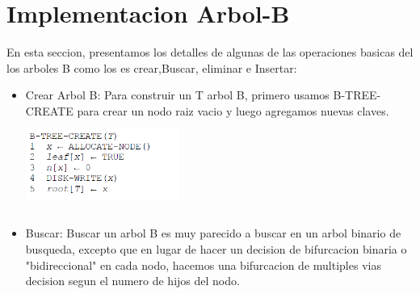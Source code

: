 \documentclass[10pt,letterpaper]{article}
\begin{document}
\section{Implementacion Arbol-B}
\vskip 0.3cm
En esta seccion, presentamos los detalles de algunas de las operaciones basicas del los arboles B como los es crear,Buscar, eliminar e Insertar:
\vskip 0.3cm
\begin{itemize}
\item Crear Arbol B: Para construir un T arbol B, primero usamos B-TREE-CREATE para crear un nodo raiz vacio y luego agregamos nuevas claves.
\vskip 0.3cm
\includegraphics[width=5cm,height=3cm]{crear} 
\vskip 0.3cm

\skip 0.3cm

\item Buscar: Buscar un arbol B es muy parecido a buscar en un arbol binario de busqueda, excepto que en lugar de hacer un
decision de bifurcacion binaria o "bidireccional" en cada nodo, hacemos una bifurcacion de multiples vias
decision segun el numero de hijos del nodo.


\end{itemize}
\end{document}

